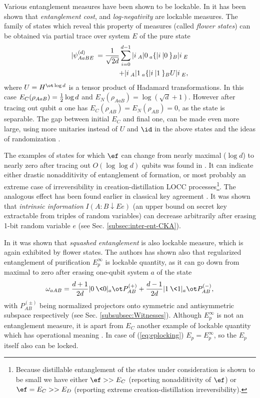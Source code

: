 \documentclass[rmp,12pt,preprint]{revtex4-2}
\begin{document}
Various entanglement measures have been shown to be lockable.
In \cite{lock-ent} it has been shown that {\it
entanglement cost}, and {\it log-negativity} are lockable measures.
The family of states which reveal this property of measures (called
{\it flower states}) can be obtained via partial trace over system $E$
of the pure state
\begin{eqnarray}
|\psi_{AaBE}^{(d)}\> = {1\over \sqrt{2d}}\sum_{i=0}^{d-1} |i\>_A|0\>_a\{|i\>|0\>\}_B|i\>_E
\label{eq:flower-purif} \\+ |i\>_A|1\>_a \{|i\>|1\>\}_B U|i\>_E,
\nonumber
\end{eqnarray}
where $U=H^{\ot \log d}$ is a tensor product of Hadamard
transformations. In this case $E_C(\rho_{AaB}) = {1\over 2}\log d $
and $E_N(\rho_{AaB})= \log (\sqrt{d} +1)$.  However after tracing
out qubit $a$ one has $E_C(\rho_{AB})=E_N(\rho_{AB})=0$, as the state
is separable. The gap between initial $E_C$ and final one, can be made
even more large, using more unitaries instead of $U$ and $\id$ in the
above states and the ideas of randomization \cite{RandomQstates}.

The examples of states for which $\ef$ can change from nearly maximal
($\log d $) to nearly zero after tracing out $O(\log \log d)$ qubits
was found in \cite{AspGenEnt}. It can indicate either drastic
nonadditivity of entanglement of formation, or most probably an
extreme case of irreversibility in creation-distillation LOCC
processes\footnote{Because distillable entanglement of the states
  under consideration is shown to be small we have either $\ef >>E_C$ (reporting nonadditivity of $\ef$) or $\ef =E_C>>E_D$ (reporting extreme creation-distillation irreversibility).}. The analogous effect has been found earlier in
classical key agreement \cite{renner-wolf-gap}. It was shown that {\it
  intrinsic information} $I(A:B\downarrow Ee)$ (an upper bound on
secret key extractable from triples of random variables) can decrease
arbitrarily after erasing 1-bit random variable $e$ (see Sec. \ref{subsec:inter-ent-CKA}).


In \cite{ChristandlW-lock} it was shown that {\it squashed
entanglement} is also lockable measure, which is again exhibited by
flower states. The authors has shown also that regularized
entanglement of purification $E_p^{\infty}$ is lockable quantity, as it
can go down from maximal to zero after erasing one-qubit system $a$ of
the state
\begin{equation}
\omega_{aAB} = {d+1\over 2d}|0\>\<0|_a \ot
P_{AB}^{(+)} + {d-1\over 2d}|1\>\<1|_a \ot P_{AB}^{(-)},
\label{eq:eplocking}
\end{equation}
with $P_{AB}^{(\pm)}$ being normalized projectors onto symmetric and
antisymmetric subspace respectively (see Sec. \ref{subsubsec:Witnesses}).  Although $E_p^{\infty}$ is not
an entanglement measure, it is apart from $E_C$ another example of
lockable quantity which has operational meaning \cite{IBMHor2002}. In
case of (\ref{eq:eplocking}) $E_p = E_p^{\infty}$, so the $E_p$ itself
also can be locked.
\end{document}

